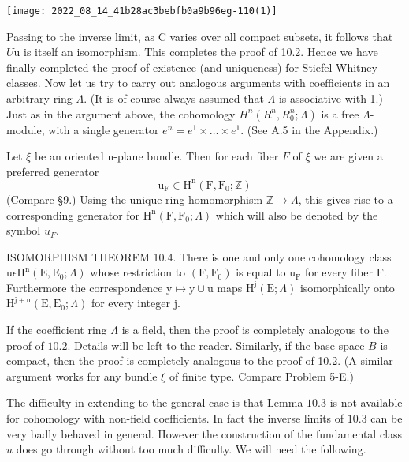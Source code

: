 \documentclass[10pt]{article}
\begin{document}
\texttt{[image: 2022\_08\_14\_41b28ac3bebfb0a9b96eg-110(1)]}

Passing to the inverse limit, as C varies over all compact subsets, it follows that $U \mathrm{u}$ is itself an isomorphism. This completes the proof of 10.2. Hence we have finally completed the proof of existence (and uniqueness) for Stiefel-Whitney classes. Now let us try to carry out analogous arguments with coefficients in an arbitrary ring $\Lambda$. (It is of course always assumed that $\Lambda$ is associative with 1.) Just as in the argument above, the cohomology $H^{n}\left(R^{n}, R_{0}^{n} ; \Lambda\right)$ is a free $\Lambda$-module, with a single generator $e^{n}=e^{1} \times \ldots \times e^{1}$. (See A.5 in the Appendix.)

Let $\xi$ be an oriented n-plane bundle. Then for each fiber $F$ of $\xi$ we are given a preferred generator
$$
\mathrm{u}_{\mathrm{F}} \in \mathrm{H}^{\mathrm{n}}\left(\mathrm{F}, \mathrm{F}_{0} ; \mathbb{Z}\right)
$$
(Compare §9.) Using the unique ring homomorphism $\mathbb{Z} \rightarrow \Lambda$, this gives rise to a corresponding generator for $\mathrm{H}^{\mathrm{n}}\left(\mathrm{F}, \mathrm{F}_{0} ; \Lambda\right)$ which will also be denoted by the symbol $u_{F}$.

ISOMORPHISM THEOREM 10.4. There is one and only one cohomology class $\mathrm{u} \epsilon \mathrm{H}^{\mathrm{n}}\left(\mathrm{E}, \mathrm{E}_{0} ; \Lambda\right)$ whose restriction to $\left(\mathrm{F}, \mathrm{F}_{0}\right)$ is equal to $\mathrm{u}_{\mathrm{F}}$ for every fiber $\mathrm{F}$. Furthermore the correspondence $\mathrm{y} \mapsto \mathrm{y} \cup \mathrm{u}$ maps $\mathrm{H}^{\mathrm{j}}(\mathrm{E} ; \Lambda)$ isomorphically onto $\mathrm{H}^{\mathrm{j}+\mathrm{n}}\left(\mathrm{E}, \mathrm{E}_{0} ; \Lambda\right)$ for every integer $\mathrm{j}$.

If the coefficient ring $\Lambda$ is a field, then the proof is completely analogous to the proof of $10.2$. Details will be left to the reader. Similarly, if the base space $B$ is compact, then the proof is completely analogous to the proof of 10.2. (A similar argument works for any bundle $\xi$ of finite type. Compare Problem 5-E.)

The difficulty in extending to the general case is that Lemma $10.3$ is not available for cohomology with non-field coefficients. In fact the inverse limits of $10.3$ can be very badly behaved in general. However the construction of the fundamental class $u$ does go through without too much difficulty. We will need the following.
\end{document}
